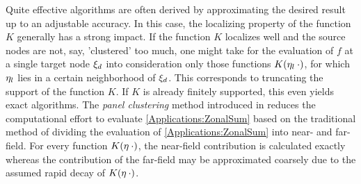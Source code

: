 Quite effective algorithms are often derived by approximating the desired result 
up to an adjustable accuracy. In this case, the localizing property of the function $K$ 
generally has a strong impact. If the function $K$ localizes well and the source nodes 
are not, say, 'clustered' too much, one might take for the evaluation of $f$ at a single target 
node $\mathbf{\xi}_{d}$ into consideration only those functions $K{\hspace{-0.4ex}}\left(\mathbf{\eta}_{l}\:\cdot\right)$, for
which $\mathbf{\eta}_{l}$ lies in a certain neighborhood of $\mathbf{\xi}_{d}$. This corresponds to 
truncating the support of the function $K$. If $K$ is already finitely supported, this even
yields exact algorithms. 
The \emph{panel clustering} method introduced in \cite{FrGlSch98} reduces the computational 
effort to evaluate \eqref{Applications:ZonalSum} based on the traditional method of dividing 
the evaluation of \eqref{Applications:ZonalSum} into near- and far-field. For every function
$K{\hspace{-0.4ex}}\left(\mathbf{\eta} \: \cdot\right)$, the near-field contribution is calculated exactly whereas the 
contribution of the far-field may be approximated coarsely due to the assumed rapid decay 
of $K{\hspace{-0.4ex}}\left(\mathbf{\eta} \: \cdot\right)$. 

